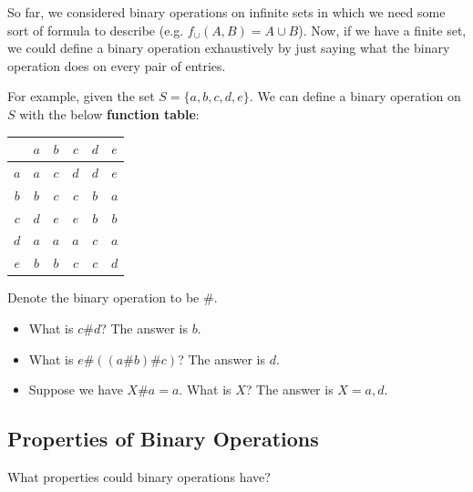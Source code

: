 \documentclass[letterpaper]{article}
\begin{document}
So far, we considered binary operations on infinite sets in which we need some sort of formula to describe (e.g. $f_{\cup}(A, B) = A \cup B$). Now, if we have a finite set, we could define a binary operation exhaustively by just saying what the binary operation does on every pair of entries.

\bigskip 

For example, given the set $S = \{a, b, c, d, e\}$. We can define a binary operation on $S$ with the below \textbf{function table}: 
\begin{center}
    \begin{tabular}{c | c c c c c}
            & $a$ & $b$ & $c$ & $d$ & $e$ \\ 
        \hline 
        $a$ & $a$ & $c$ & $d$ & $d$ & $e$ \\ 
        $b$ & $b$ & $c$ & $c$ & $b$ & $a$ \\ 
        $c$ & $d$ & $e$ & $e$ & $b$ & $b$ \\ 
        $d$ & $a$ & $a$ & $a$ & $c$ & $a$ \\ 
        $e$ & $b$ & $b$ & $c$ & $c$ & $d$
    \end{tabular}
\end{center}
Denote the binary operation to be $\#$.
\begin{itemize}
    \item What is $c \# d$? The answer is $b$. 
    \item What is $e \# ((a \# b) \# c)$? The answer is $d$.
    \item Suppose we have $X \# a = a$. What is $X$? The answer is $X = a, d$.
\end{itemize}

\subsection{Properties of Binary Operations}
What properties could binary operations have?
\end{document}
